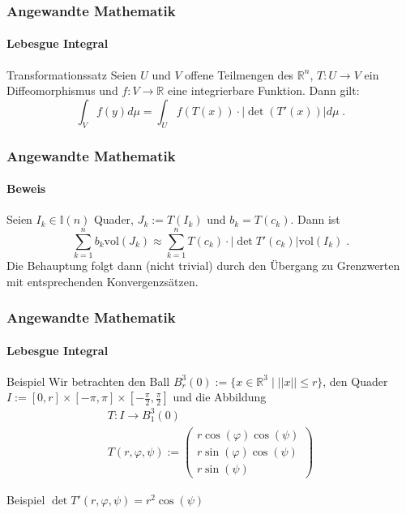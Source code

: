 \documentclass{beamer}
\begin{document}
\begin{frame}
    \frametitle{Angewandte Mathematik}
\framesubtitle{Lebesgue Integral}
\begin{block}{Transformationssatz}
Seien $U$ und $V$ offene Teilmengen des $\mathbb{R}^n$, $T: U \to V$ ein Diffeomorphismus und $f: V \to \mathbb{R}$ eine integrierbare Funktion. Dann gilt:
$$ \int_V  f(y)  d \mu = \int_U f(T (x))  \cdot | \det(T' (x)) | d \mu   \; .$$
\end{block}
 \end{frame}

\begin{frame}
    \frametitle{Angewandte Mathematik}
\framesubtitle{Beweis}
Seien $I_k \in \mathbb{I}(n)$ Quader, $J_k := T(I_k)$ und $b_k = T(c_k)$. Dann ist 
$$\sum_{k=1}^n  b_k  \text{vol}(J_k) \approx  \sum_{k=1}^n T(c_k) \cdot | \det T' (c_k)|  \text{vol}(I_k) \; .$$
Die Behauptung folgt dann (nicht trivial) durch den Übergang zu Grenzwerten mit entsprechenden Konvergenzsätzen.
 \end{frame}


\begin{frame}
    \frametitle{Angewandte Mathematik}
\framesubtitle{Lebesgue Integral}
\begin{block}{Beispiel}
Wir betrachten den Ball $B_r^3(0):= \{ x \in \mathbb{R}^3 \; | \; || x || \leq r  \}$, den Quader $I := [0,r] \times [- \pi, \pi] \times [- \frac{\pi}{2}, \frac{\pi}{2}]$ und die Abbildung
\begin{align*}
T : I \to B_1^3(0) \\
T(r, \varphi, \psi) := \begin{pmatrix} r \cos(\varphi) \cos(\psi)   \\  r \sin(\varphi) \cos(\psi) \\ r  \sin(\psi)     \end{pmatrix}
\end{align*}
\end{block}
\begin{block}{Beispiel}
$\det T'(r, \varphi, \psi) = r^2 \cos(\psi)$
\end{block}
 \end{frame}
\end{document}
